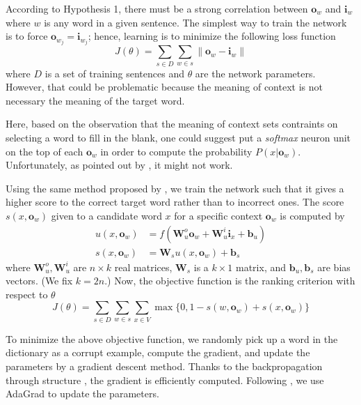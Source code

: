 \documentclass[11pt]{article}
\begin{document}
According to Hypothesis 1, there must be a strong correlation 
between $\mathbf{o}_{w}$ and $\mathbf{i}_{w}$ where $w$ is any word in 
a given sentence. The simplest way to train the network is to force 
$\mathbf{o}_{w_j} = \mathbf{i}_{w_j}$; hence, learning is to minimize the following 
loss function
\begin{equation}
	J(\theta) = \sum_{s \in D} \sum_{w \in s} \| \mathbf{o}_{w} - \mathbf{i}_{w} \|
\end{equation}
where $D$ is a set of training sentences and $\theta$ are the network parameters. 
However, that could be problematic because 
the meaning of context is not necessary the meaning of the target word.

Here, based on the observation that the meaning of context sets contraints on 
selecting a word to fill in the blank, one could suggest put a \textit{softmax} neuron 
unit on the top of each $\mathbf{o}_w$ in order to compute the probability $P(x|\mathbf{o}_w)$. 
Unfortunately, as pointed out by \cite{collobert_natural_2011}, it might not work. 

Using the same method proposed by \cite{collobert_natural_2011}, we train the network 
such that it gives a higher score to the correct target word rather than to incorrect ones. 
The score $s(x,\mathbf{o}_w)$ given to a candidate word $x$ for a specific context 
$\mathbf{o}_w$ is computed by 
\begin{align}
	u(x,\mathbf{o}_w) & = f(\mathbf{W}_u^o \mathbf{o}_w + \mathbf{W}_u^i \mathbf{i}_x + \mathbf{b}_u) \\
	s(x,\mathbf{o}_w) & = \mathbf{W}_s u(x,\mathbf{o}_w) + \mathbf{b}_s
\end{align}
where $\mathbf{W}_u^o,\mathbf{W}_u^i$ are $n \times k$ real matrices, $ \mathbf{W}_s$ is 
a $k \times 1$ matrix, and $\mathbf{b}_u, \mathbf{b}_s$ are bias vectors. (We fix $k=2n$.) 
Now, the objective function is the ranking criterion with respect to $\theta$
\begin{equation}
	J(\theta) = \sum_{s \in D} \sum_{w \in s} \sum_{x \in V} \max \{0, 1 - s(w,\mathbf{o}_w) + s(x,\mathbf{o}_w) \}
\end{equation}

To minimize the above objective function, we randomly pick up a word 
in the dictionary as a corrupt example, compute the gradient, and update 
the parameters by a gradient descent method. Thanks to the backpropagation 
through structure \cite{goller_learning_1996}, the gradient is efficiently computed. 
Following \cite{socher2013recursive}, we use AdaGrad \cite{duchi2011adaptive}
to update the parameters.



\end{document}
